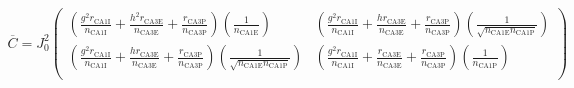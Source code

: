 \documentclass [12pt]{amsart}
\theoremstyle{definition}
\begin{document}
\begin{align*}
\overline C = J_0 ^2 \begin{pmatrix}
\left(\frac{g^2 r_{\text{CA1I}}}{n_{\text{CA1I}}}+\frac{h^2 r_{\text{CA3E}}}{n_{\text{CA3E}}}+\frac{r_{\text{CA3P}}}{n_{\text{CA3P}}}\right) \left (\frac{1}{n_{\text{CA1E}}}\right)&
\left(\frac{g^2 r_{\text{CA1I}}}{n_{\text{CA1I}}}+\frac{h r_{\text{CA3E}}}{n_{\text{CA3E}}}+\frac{r_{\text{CA3P}}}{n_{\text{CA3P}}}\right) \left (\frac{1}{\sqrt{n_{\text{CA1E}}n_{\text{CA1P}}}}\right)\\
\left(\frac{g^2 r_{\text{CA1I}}}{n_{\text{CA1I}}}+\frac{h r_{\text{CA3E}}}{n_{\text{CA3E}}}+\frac{r_{\text{CA3P}}}{n_{\text{CA3P}}}\right) \left (\frac{1}{\sqrt{n_{\text{CA1E}}n_{\text{CA1P}}}}\right) &
\left(\frac{g^2 r_{\text{CA1I}}}{n_{\text{CA1I}}}+\frac{r_{\text{CA3E}}}{n_{\text{CA3E}}}+\frac{r_{\text{CA3P}}}{n_{\text{CA3P}}}\right)\left (\frac{1}{n_{\text{CA1P}}}\right)\\
\end{pmatrix}
\end{align*}



\end{document}
